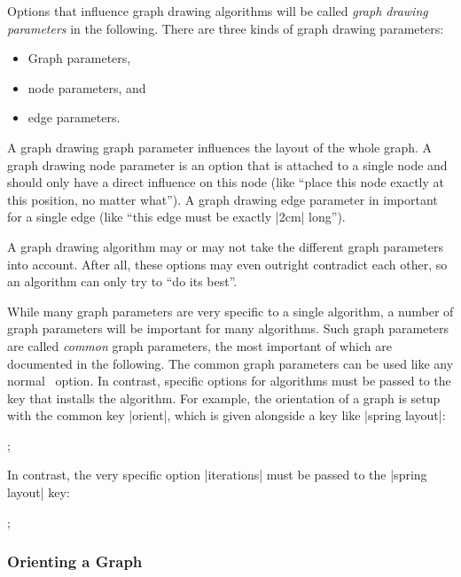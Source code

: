 Options that influence graph drawing algorithms will be called
\emph{graph drawing parameters} in the following. There are three kinds of
graph drawing parameters:
\begin{itemize}
\item Graph parameters,
\item node parameters, and
\item edge parameters.
\end{itemize}
A graph drawing graph parameter influences the layout of the whole
graph. A graph drawing node parameter is an option that is attached to
a single node and should only have a direct influence on this node
(like ``place this node exactly at this position, no matter what''). A
graph drawing edge parameter in important for a single edge (like
``this edge must be exactly |2cm| long'').

A graph drawing algorithm may or may not take the different graph
parameters into account. After all, these options may even outright
contradict each other, so an algorithm can only try to ``do its
best''.

While many graph parameters are very specific to a single algorithm, a
number of graph parameters will be important for many algorithms. Such
graph parameters are called \emph{common} graph parameters, the most
important of which are documented in the following. The common graph
parameters can be used like any normal \tikzname\ option. In contrast,
specific options for algorithms must be passed to the key that
installs the algorithm. For example, the orientation of a graph
is setup with the common key |orient|, which is given alongside a key
like |spring layout|:

\begin{codeexample}[]
\tikz {};  
\end{codeexample}

In contrast, the very specific option |iterations| must be
passed to the |spring layout| key:

\begin{codeexample}[]
\tikz {};  
\end{codeexample}



\subsubsection{Orienting a Graph}

